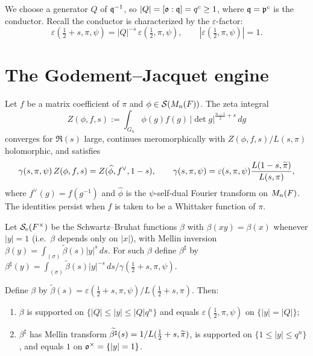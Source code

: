 We choose a generator $Q$ of $\mathfrak{q}^{-1}$, so $|Q|=[\mathfrak{o}:\mathfrak{q}]=q^{c}\ge1$, where
$\mathfrak{q}=\mathfrak{p}^{c}$ is the conductor. Recall the
conductor is characterized by the $\varepsilon$-factor:
\begin{equation}\label{eq:eps}
\varepsilon(\tfrac12+s,\pi,\psi)=|Q|^{-s}\,\varepsilon(\tfrac12,\pi,\psi),
\qquad |\varepsilon(\tfrac12,\pi,\psi)|=1 .
\end{equation}

\section*{The Godement--Jacquet engine}

\begin{qtwolemma}\label{lem:GJ}
Let $f$ be a matrix coefficient of $\pi$ and $\phi\in\mathcal{S}(M_n(F))$. The zeta
integral
\[
Z(\phi,f,s):=\int_{G_n}\phi(g)f(g)\,|\det g|^{\frac{n-1}{2}+s}\,dg
\]
converges for $\Re(s)$ large, continues meromorphically with
$Z(\phi,f,s)/L(s,\pi)$ holomorphic, and satisfies
\[
\gamma(s,\pi,\psi)\,Z(\phi,f,s)=Z(\widehat\phi,f^\vee,1-s),\qquad
\gamma(s,\pi,\psi)=\varepsilon(s,\pi,\psi)\frac{L(1-s,\widetilde{\pi})}{L(s,\pi)},
\]
where $f^\vee(g)=f(g^{-1})$ and $\widehat\phi$ is the $\psi$-self-dual Fourier
transform on $M_n(F)$. The identities persist when $f$ is taken to be a
Whittaker function of $\pi$.
\end{qtwolemma}

Let $\mathcal{S}_{\mathrm e}(F^\times)$ be the Schwartz--Bruhat functions $\beta$ with
$\beta(xy)=\beta(x)$ whenever $|y|=1$ (i.e.\ $\beta$ depends only on $|x|$),
with Mellin inversion $\beta(y)=\int_{(\sigma)}\tilde\beta(s)|y|^s\,ds$. For such
$\beta$ define $\beta^\sharp$ by
$\beta^\sharp(y)=\int_{(\sigma)}\tilde\beta(s)|y|^{-s}\,ds/\gamma(\tfrac12+s,\pi,\psi)$.

\begin{qtwolemma}\label{lem:beta}
Define $\beta$ by $\tilde\beta(s)=\varepsilon(\tfrac12+s,\pi,\psi)/L(\tfrac12+s,\pi)$.
Then:
\begin{enumerate}\setlength\itemsep{2pt}
\item $\beta$ is supported on $\{|Q|\le|y|\le|Q|q^n\}$ and equals
$\varepsilon(\tfrac12,\pi,\psi)$ on $\{|y|=|Q|\}$;
\item $\beta^\sharp$ has Mellin transform $\widetilde{\beta^\sharp}(s)=1/L(\tfrac12+s,\widetilde{\pi})$,
is supported on $\{1\le|y|\le q^n\}$, and equals $1$ on $\mathfrak{o}^\times=\{|y|=1\}$.
\end{enumerate}
\end{qtwolemma}

